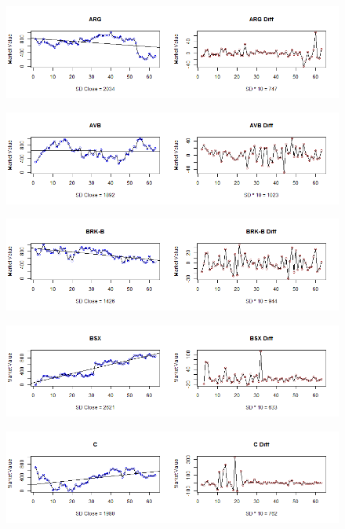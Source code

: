 \begin{figure}[!h]
	\includegraphics[scale=0.5]{images/appendixC/ARG_FRST.png}
\end{figure}

\begin{figure}[!h]
	\includegraphics[scale=0.5]{images/appendixC/AVB_FRST.png}
\end{figure}

\begin{figure}[!h]
	\includegraphics[scale=0.5]{images/appendixC/BRK-B_FRST.png}
\end{figure}

\begin{figure}[!h]
	\includegraphics[scale=0.5]{images/appendixC/BSX_FRST.png}
\end{figure}

\begin{figure}[!h]
	\includegraphics[scale=0.5]{images/appendixC/C_FRST.png}
\end{figure}


